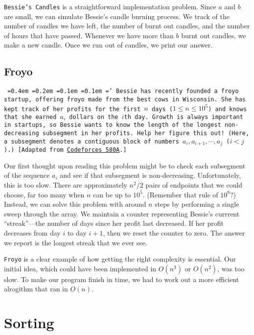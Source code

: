 \texttt{Bessie's Candles} is a straightforward implementation problem. Since $a$ and $b$ are small, we can simulate Bessie's candle burning process. We track of the number of candles we have left, the number of burnt out candles, and the number of hours that have passed. Whenever we have more than $b$ burnt out candles, we make a new candle. Once we run out of candles, we print our answer.

\subsection{Froyo}

\texttt{
  \font=0.4em%
  \font=0.2em%
  \font=0.1em%
  \font=0.1em%
  \hyphenchar\font=`\-%
  Bessie has recently founded a froyo startup, offering froyo made from the best cows in Wisconsin. She has kept track of her profits for the first $n$ days ($1 \le n \le 10^5$) and knows that she earned $a_i$ dollars on the $i$th day. Growth is always important in startups, so Bessie wants to know the length of the longest non-decreasing subsegment in her profits. Help her figure this out! (Here, a subsegment denotes a contiguous block of numbers $a_i, a_{i+1}, \cdots, a_j$ ($i < j$).) [Adapted from \href{http://codeforces.com/problemset/problem/580/A}{Codeforces 580A}.]
}

Our first thought upon reading this problem might be to check each subsegment of the sequence $a_i$ and see if that subsegment is non-decreasing. Unfortunately, this is too slow. There are approximately $n^2/2$ pairs of endpoints that we could choose, far too many when $n$ can be up to $10^5$. (Remember that rule of $10^8$?) Instead, we can solve this problem with around $n$ steps by performing a single sweep through the array. We maintain a counter representing Bessie's currrent ``streak''---the number of days since her profit last decreased. If her profit decreases from day $i$ to day $i+1$, then we reset the counter to zero. The answer we report is the longest streak that we ever see.

\texttt{Froyo} is a clear example of how getting the right complexity is essential. Our initial idea, which could have been implemented in $O(n^3)$ or $O(n^2)$, was too slow. To make our program finish in time, we had to work out a more efficient alrogithm that ran in $O(n)$.

\section{Sorting}

